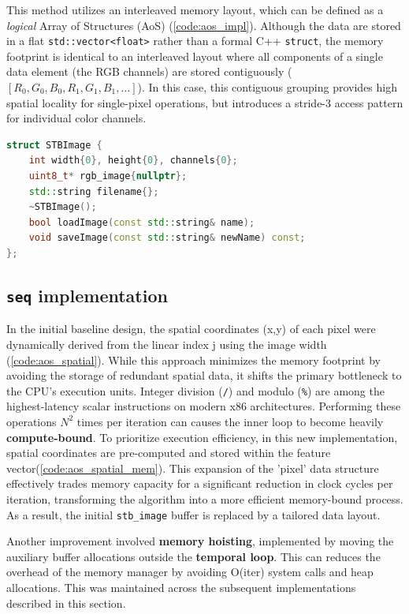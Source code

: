 \documentclass[10pt,twocolumn,letterpaper]{article}
\begin{document}
This method utilizes an interleaved memory layout, which can be defined as a \textit{logical} Array of Structures (AoS) (\cref{code:aos_impl}). Although the data are stored in a flat \texttt{std::vector<float>} rather than a formal C++ \texttt{struct}, the memory footprint is identical to an interleaved layout where all components of a single data element (the RGB channels) are stored contiguously ($[R_0,G_0,B_0,R_1,G_1,B_1,…]$). In this case, this contiguous grouping provides high spatial locality for single-pixel operations, but introduces a stride-3 access pattern for individual color channels.

\begin{lstlisting}[language=C++, caption={baseline Image implementation}, label={code:aos_impl}]
struct STBImage {
    int width{0}, height{0}, channels{0};
    uint8_t* rgb_image{nullptr};
    std::string filename{};
    ~STBImage();
    bool loadImage(const std::string& name);
    void saveImage(const std::string& newName) const;
};
\end{lstlisting}

\subsection{\texttt{seq} implementation}\label{subsec:seq}
In the initial baseline design, the spatial coordinates (x,y) of each pixel were dynamically derived  from the linear index j using the image width (\cref{code:aos_spatial}). While this approach minimizes the memory footprint by avoiding the storage of redundant spatial data, it shifts the primary bottleneck to the CPU's execution units. Integer division (\texttt{/}) and modulo (\texttt{\%}) are among the highest-latency scalar instructions on modern x86 architectures. Performing these operations $N^2$ times per iteration  can causes the inner loop to become heavily \textbf{compute-bound}. To prioritize execution efficiency, in this new implementation,  spatial coordinates are pre-computed and stored within the feature vector(\cref{code:aos_spatial_mem}). This expansion of the 'pixel' data structure effectively trades memory capacity for a significant reduction in clock cycles per iteration, transforming the algorithm into a more efficient memory-bound process. As a result, the initial \texttt{stb\_image} buffer is replaced by a tailored data layout.

Another improvement involved \textbf{memory hoisting}, implemented by moving the auxiliary buffer allocations outside the \textbf{temporal loop}. This can reduces the overhead of the memory manager by avoiding O(iter) system calls and heap allocations. This was maintained across the subsequent implementations described in this section.
\end{document}
